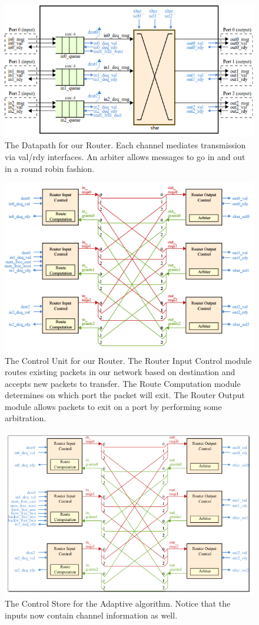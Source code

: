 \documentclass[10pt]{article}
\begin{document}
\begin{figure}[h]
	\centering
	\includegraphics[scale=0.7]{dpath}
	\caption
	{
		The Datapath for our Router.
		Each channel mediates transmission via val/rdy interfaces.
		An arbiter allows messages to go in and out in a round robin fashion.
	}
	\label{fig:dpath}
\end{figure}

\begin{figure}[h]
	\centering
	\includegraphics[scale=0.7]{baselinectrl}
	\caption
	{
		The Control Unit for our Router.
		The Router Input Control module routes existing packets in our network 
		based on destination and accepts new packets to transfer.
		The Route Computation module determines on which port the packet will
		exit.
		The Router Output module allows packets to exit on a port by performing
		some arbitration. 
	}
	\label{fig:ctrl}
\end{figure}

\begin{figure}[h]
	\centering
	\includegraphics[scale=1.0]{altctrl}
	\caption{The Control Store for the Adaptive algorithm. 
			 Notice that the inputs now contain channel information as well.}
	\label{fig:altctrl}
\end{figure}
\end{document}
